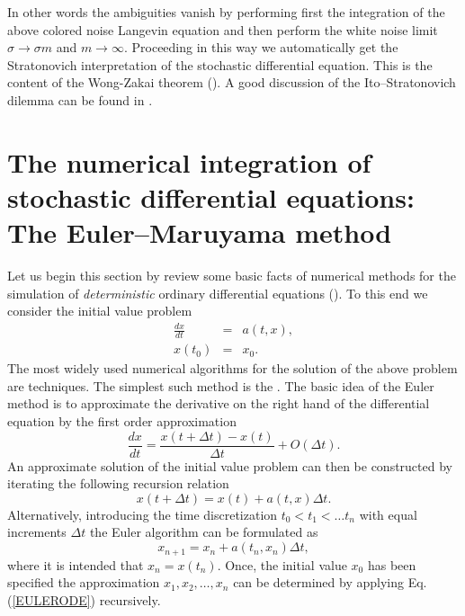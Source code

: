In other words the ambiguities vanish by performing first the 
integration of the above colored noise Langevin equation and then 
perform the white noise limit $\sigma \rightarrow \sigma m$ and 
$m \rightarrow \infty$. Proceeding in this way we automatically 
get the Stratonovich interpretation of the stochastic differential 
equation. This is the content of the Wong-Zakai theorem 
(\cite{HORSTHEMKE}). A good discussion of the Ito--Stratonovich
dilemma can be found in \cite{VAN_KAMPEN}.



\section[The Euler--Maruyama method]%
{The numerical integration of stochastic differential 
equations: The Euler--Maruyama method}
Let us begin this section by review some basic facts of numerical 
methods for the simulation of {\em deterministic} ordinary 
differential equations (\cite{GARCIA,PRESS}). 
To this end we consider the initial value 
problem
\begin{eqnarray*}
\frac{dx}{dt} &=& a(t,x), \\
   x(t_0) & = & x_0.
\end{eqnarray*}
The most widely used numerical algorithms for the solution of the 
above problem are  techniques. The simplest such 
method is the . The basic idea of the Euler 
method is to approximate the derivative on the right hand of the 
differential equation by the first order approximation
\begin{equation*}
\frac{dx}{dt} = \frac{x(t+\Delta t) - x(t)}{\Delta t} + O(\Delta 
t).
\end{equation*}
An approximate solution of the initial value problem can then be 
constructed by iterating the following recursion relation
\begin{equation*}
x(t+\Delta t) = x(t) + a(t,x)\Delta t.
\end{equation*}
Alternatively, introducing the time discretization
$t_0 < t_1 < \ldots t_n$ with equal increments $\Delta t$
the Euler algorithm can be formulated as
\begin{equation}
\label{EULERODE}
x_{n+1} = x_{n} + a(t_n,x_n) \Delta t,
\end{equation}
where it is intended that $x_n = x(t_n)$. Once, the initial value 
$x_0$ has been specified the approximation $x_1, x_2, \ldots, x_n$ 
can be determined by applying Eq. (\ref{EULERODE}) recursively.


